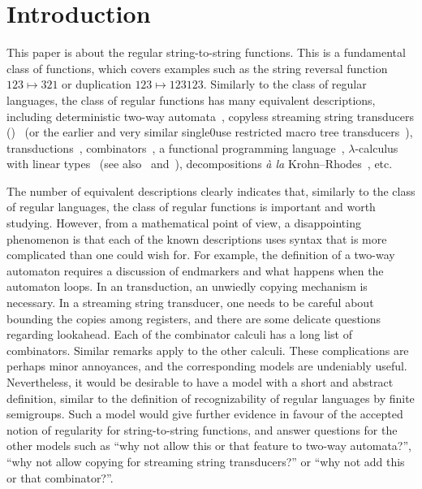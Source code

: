 \section{Introduction}
\label{sec:intro}

This paper is about the regular string-to-string functions. This is a fundamental class of functions, which covers examples such as the string reversal function $123 \mapsto 321$ or duplication $123 \mapsto 123123$. Similarly to the class of regular languages, the class of regular functions has many equivalent descriptions, including deterministic two-way automata~\cite[Note~4]{shepherdson1959reduction}, copyless streaming string transducers (\sst)~\cite[Section~3]{alurExpressivenessStreamingString2010} (or the earlier and very similar single0use restricted macro tree transducers~\cite[Section~5]{MacroMSO}), \mso transductions~\cite[Theorem~13]{engelfrietMSODefinableString2001}, combinators~\cite[Section~2]{alur2014regular}, a functional programming language~\cite[Section~6]{bojanczykRegularFirstOrderList2018}, $\lambda$-calculus with linear types~\cite[Theorem~3]{LambdaTransducer} (see also~\cite[Claim~6.2]{IATLC} and~\cite[Theorem~1.2.3]{titoPhD}), decompositions \textit{à la} Krohn--Rhodes~\cite[Theorem~18, item~4]{bojanczykstefanski2020}, etc.

The number of equivalent descriptions clearly indicates that, similarly to the class of regular languages, the class of regular functions is important and worth studying. However, from a mathematical point of view, a disappointing phenomenon is that each of the known descriptions uses syntax that is more complicated than one could wish for. For example, the definition of a two-way automaton requires a discussion of endmarkers and what happens when the automaton loops. In an \mso transduction, an unwiedly copying mechanism is necessary. In a streaming string transducer, one needs to be careful about bounding the copies among registers, and there are some delicate questions regarding lookahead. Each of the combinator calculi has a long list of combinators. Similar remarks apply to the other calculi. These complications are perhaps minor annoyances, and the corresponding models are undeniably useful. Nevertheless, it would be desirable to have a model with a short and abstract definition, similar to the definition of recognizability of regular languages by finite semigroups. Such a model  would give further evidence in favour of the accepted notion of regularity for string-to-string functions, and answer questions for the other models such as ``why not allow this or that feature to two-way automata?'', ``why not allow copying for streaming string transducers?'' or ``why not add this or that combinator?''.

